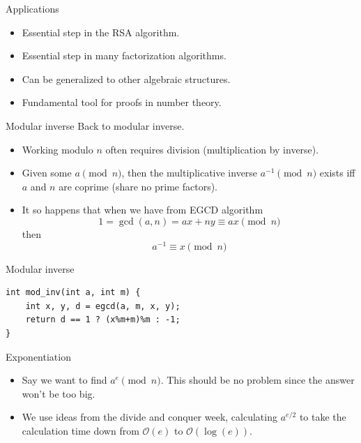 \documentclass{beamer}
\begin{document}
\begin{frame}[plain]{Applications}
  \vspace{30pt}
  \begin{itemize}
    \item Essential step in the RSA algorithm.
    \item Essential step in many factorization algorithms.
    \item Can be generalized to other algebraic structures.
    \item Fundamental tool for proofs in number theory.
  \end{itemize}
\end{frame}

\begin{frame}[plain]{Modular inverse}
  \vspace{20pt}
  Back to modular inverse.
  \begin{itemize}
    \item Working modulo $n$ often requires division (multiplication by inverse).
    \item Given some $a \pmod{n}$, then the multiplicative inverse $a^{-1}
      \pmod{n}$ exists iff $a$ and $n$ are coprime (share no prime factors).
    \item It so happens that when we have from EGCD algorithm
      \[
        1 = \gcd(a,n) = ax + ny \equiv ax \pmod{n}
      \]
      then \[ a^{-1} \equiv x \pmod{n} \]
  \end{itemize}
\end{frame}

\begin{frame}{Modular inverse}
    \begin{verbatim}
int mod_inv(int a, int m) {
    int x, y, d = egcd(a, m, x, y);
    return d == 1 ? (x%m+m)%m : -1;
}
\end{verbatim}
\end{frame}

\begin{frame}[plain]{Exponentiation}
  \vspace{20pt}
  \begin{itemize}
    \item Say we want to find $a^e \pmod{n}$. This should be no problem since the answer won't be too big.
    
    \item<2-> We use ideas from the divide and conquer week, calculating $a^{e/2}$ to take the calculation time down from $\mathcal{O}(e)$ to $\mathcal{O}(\log(e))$.
  \end{itemize}
\end{frame}
\end{document}
